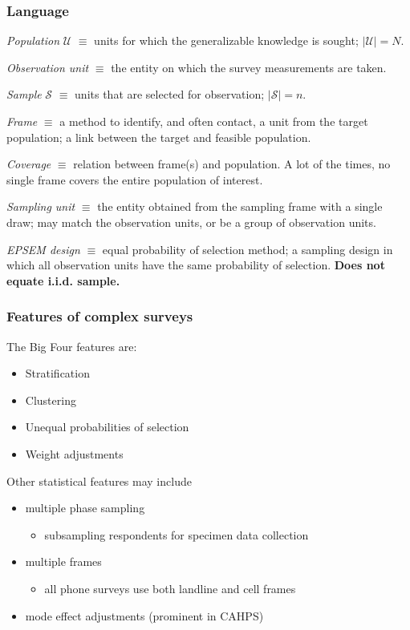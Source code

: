 \documentclass{beamer}
\begin{document}
\begin{frame}\frametitle{Language}

\textit{Population} $\mathcal U$ $\equiv$ units for which the generalizable knowledge is sought; $|\mathcal{U}|=N$.

\smallskip

\textit{Observation unit} $\equiv$ the entity on which the survey measurements are
taken.

\smallskip

\textit{Sample} $\mathcal S$ $\equiv$ units that are selected for observation; $|\mathcal{S}|=n$.

\smallskip

\textit{Frame} $\equiv$ a method to identify, and often contact, a unit from the target population; a link between the target and feasible population.

\smallskip

\textit{Coverage} $\equiv$ relation between frame(s) and population.
A lot of the times, no single frame covers the entire population of interest.

\smallskip

\textit{Sampling unit} $\equiv$ the entity obtained from the sampling frame 
with a single draw; 
may match the observation units, or be a group of observation units.

\smallskip

\textit{EPSEM design} $\equiv$ equal probability of selection method; a sampling
design in which all observation units have the same probability of selection.
\textbf{Does not equate i.i.d. sample.}

\end{frame}

\begin{frame}\frametitle{Features of complex surveys}

The Big Four features are:

\begin{itemize}
    \item Stratification
    \item Clustering
    \item Unequal probabilities of selection
    \item Weight adjustments
\end{itemize}

Other statistical features may include
\begin{itemize}
    \item multiple phase sampling
        \begin{itemize} \item subsampling respondents for specimen data collection \end{itemize}
    \item multiple frames
        \begin{itemize} \item all phone surveys use both landline and cell frames \end{itemize}
    \item mode effect adjustments (prominent in CAHPS)
\end{itemize}

\end{frame}
\end{document}
